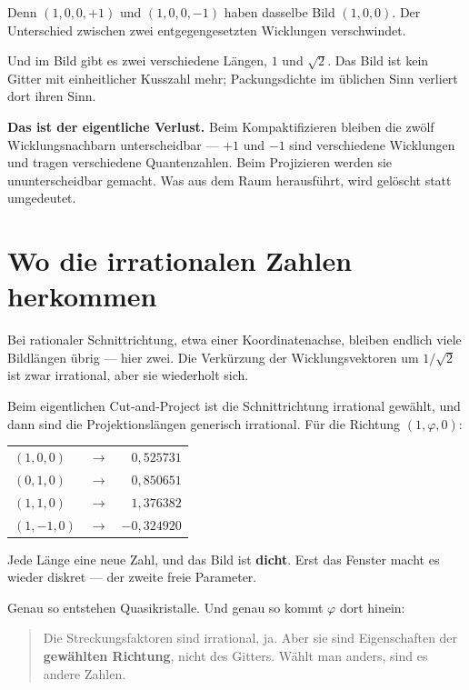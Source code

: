 \documentclass[11pt]{report}
\begin{document}
Denn $(1,0,0,+1)$ und $(1,0,0,-1)$ haben dasselbe Bild $(1,0,0)$. Der
Unterschied zwischen zwei entgegengesetzten Wicklungen verschwindet.

Und im Bild gibt es zwei verschiedene Längen, $1$ und $\sqrt2$. Das
Bild ist kein Gitter mit einheitlicher Kusszahl mehr; Packungsdichte im
üblichen Sinn verliert dort ihren Sinn.

\textbf{Das ist der eigentliche Verlust.} Beim Kompaktifizieren bleiben
die zwölf Wicklungsnachbarn unterscheidbar --- $+1$ und $-1$ sind
verschiedene Wicklungen und tragen verschiedene Quantenzahlen. Beim
Projizieren werden sie ununterscheidbar gemacht. Was aus dem Raum
herausführt, wird gelöscht statt umgedeutet.

\section{Wo die irrationalen Zahlen herkommen}

Bei rationaler Schnittrichtung, etwa einer Koordinatenachse, bleiben
endlich viele Bildlängen übrig --- hier zwei. Die Verkürzung der
Wicklungsvektoren um $1/\sqrt2$ ist zwar irrational, aber sie
wiederholt sich.

Beim eigentlichen Cut-and-Project ist die Schnittrichtung irrational
gewählt, und dann sind die Projektionslängen generisch irrational. Für
die Richtung $(1, \varphi, 0)$:
\begin{center}
\begin{tabular}{lcr}
$(1, 0, 0)$ & $\longrightarrow$ & $0{,}525731$ \\
$(0, 1, 0)$ & $\longrightarrow$ & $0{,}850651$ \\
$(1, 1, 0)$ & $\longrightarrow$ & $1{,}376382$ \\
$(1,-1, 0)$ & $\longrightarrow$ & $-0{,}324920$ \\
\end{tabular}
\end{center}

Jede Länge eine neue Zahl, und das Bild ist \textbf{dicht}. Erst das
Fenster macht es wieder diskret --- der zweite freie Parameter.

Genau so entstehen Quasikristalle. Und genau so kommt $\varphi$ dort
hinein:

\begin{quote}
Die Streckungsfaktoren sind irrational, ja. Aber sie sind Eigenschaften
der \textbf{gewählten Richtung}, nicht des Gitters. Wählt man anders,
sind es andere Zahlen.
\end{quote}
\end{document}
